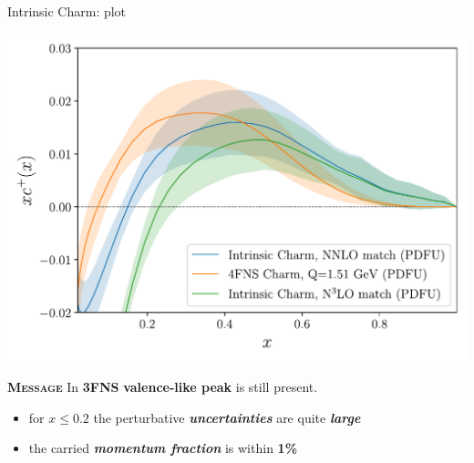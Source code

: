 \documentclass[9pt]{beamer}
\begin{document}
\begin{frame}{Intrinsic Charm: \pdf{} plot}
	\begin{center}
		\includegraphics[width=.7\linewidth]{4fns_3fns_nnlo_n3lo}
	\end{center}

    \textsc{\textbf{Message}} In \textbf{\alert{3FNS}} \textbf{valence-like
    peak} is still present.

	\begin{itemize}
        \item for \textbf{$x\leq 0.2$} the perturbative
            \textit{\textbf{uncertainties}} are quite \textit{\textbf{large}}
        \item the carried \textit{\textbf{momentum fraction}} is within \textbf{1\%}
	\end{itemize}
\end{frame}
\end{document}
